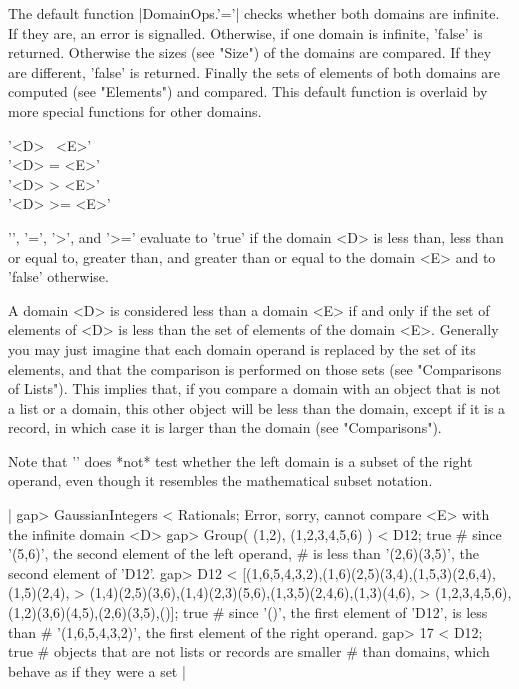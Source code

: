 The  default function  |DomainOps.'='|  checks whether  both domains  are
infinite.  If they are, an error is signalled.  Otherwise, if  one domain
is infinite, 'false'  is returned.  Otherwise  the sizes (see "Size")  of
the domains are compared.  If they are  different,  'false' is  returned.
Finally  the  sets  of   elements  of  both  domains  are  computed  (see
"Elements") and compared.   This  default function  is overlaid  by  more
special functions for other domains.

'<D> \<\ <E>' \\
'<D> \<= <E>' \\
'<D>  >  <E>' \\
'<D>  >= <E>'

'\<', '\<=', '>', and '>=' evaluate  to 'true' if the  domain <D> is less
than, less than or equal to,  greater than, and greater  than or equal to
the domain <E> and to 'false' otherwise.

A domain <D> is considered less than a  domain <E> if and only if the set
of elements of <D> is less than  the set of elements  of the  domain <E>.
Generally you may just imagine  that  each domain operand is  replaced by
the set of its  elements, and that the comparison is performed  on  those
sets (see "Comparisons of Lists").  This  implies that, if you compare  a
domain with an  object that is not a list or a domain,  this other object
will be less than the domain, except if it  is a record, in which case it
is larger than the domain (see "Comparisons").

Note that '\<' does *not* test whether the left domain is a subset of the
right  operand,   even  though  it  resembles   the  mathematical  subset
notation.

|    gap> GaussianIntegers < Rationals;
    Error, sorry, cannot compare <E> with the infinite domain <D>
    gap> Group( (1,2), (1,2,3,4,5,6) ) < D12;
    true     # since '(5,6)', the second element of the left operand,
             # is less than '(2,6)(3,5)', the second element of 'D12'.
    gap> D12 < [(1,6,5,4,3,2),(1,6)(2,5)(3,4),(1,5,3)(2,6,4),(1,5)(2,4),
    >           (1,4)(2,5)(3,6),(1,4)(2,3)(5,6),(1,3,5)(2,4,6),(1,3)(4,6),
    >           (1,2,3,4,5,6),(1,2)(3,6)(4,5),(2,6)(3,5),()];
    true     # since '()', the first element of 'D12', is less than
             # '(1,6,5,4,3,2)', the first element of the right operand.
    gap> 17 < D12;
    true     # objects that are not lists or records are smaller
             # than domains, which behave as if they were a set |

